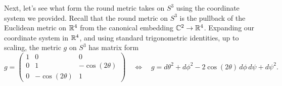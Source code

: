 \documentclass{../../templates/lkx_pset}
\begin{document}
\begin{parts}
	Next, let's see what form the round metric takes on $S^3$ using the coordinate system we provided. Recall that the round metric on $S^3$ is the pullback of the Euclidean metric on $\mathbb{R}^4$ from the canonical embedding $\mathbb{C}^2\to \mathbb{R}^4$. Expanding our coordinate system in $\mathbb{R}^4$, and
	using standard trigonometric identities, up to scaling, the metric $g$ on $S^3$ has matrix form
	\[
		g =
		\begin{pmatrix} 1 & 0              & 0              \\
                0 & 1              & -\cos(2\theta) \\
                0 & -\cos(2\theta) & 1\end{pmatrix}\quad\iff\quad
		g = d\theta^2 + d\phi^2- 2\cos (2\theta) \,d\phi\, d\psi + d\psi^2.
	\]


\end{parts}
\end{document}
